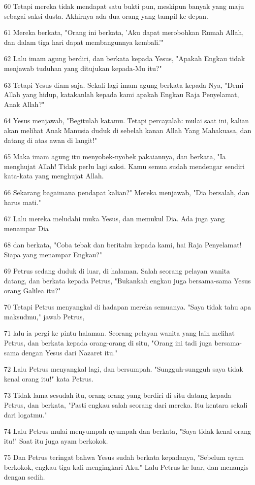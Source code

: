 \par 60 Tetapi mereka tidak mendapat satu bukti pun, meskipun banyak yang maju sebagai saksi dusta. Akhirnya ada dua orang yang tampil ke depan.
\par 61 Mereka berkata, "Orang ini berkata, 'Aku dapat merobohkan Rumah Allah, dan dalam tiga hari dapat membangunnya kembali.'"
\par 62 Lalu imam agung berdiri, dan berkata kepada Yesus, "Apakah Engkau tidak menjawab tuduhan yang ditujukan kepada-Mu itu?"
\par 63 Tetapi Yesus diam saja. Sekali lagi imam agung berkata kepada-Nya, "Demi Allah yang hidup, katakanlah kepada kami apakah Engkau Raja Penyelamat, Anak Allah?"
\par 64 Yesus menjawab, "Begitulah katamu. Tetapi percayalah: mulai saat ini, kalian akan melihat Anak Manusia duduk di sebelah kanan Allah Yang Mahakuasa, dan datang di atas awan di langit!"
\par 65 Maka imam agung itu menyobek-nyobek pakaiannya, dan berkata, "Ia menghujat Allah! Tidak perlu lagi saksi. Kamu semua sudah mendengar sendiri kata-kata yang menghujat Allah.
\par 66 Sekarang bagaimana pendapat kalian?" Mereka menjawab, "Dia bersalah, dan harus mati."
\par 67 Lalu mereka meludahi muka Yesus, dan memukul Dia. Ada juga yang menampar Dia
\par 68 dan berkata, "Coba tebak dan beritahu kepada kami, hai Raja Penyelamat! Siapa yang menampar Engkau?"
\par 69 Petrus sedang duduk di luar, di halaman. Salah seorang pelayan wanita datang, dan berkata kepada Petrus, "Bukankah engkau juga bersama-sama Yesus orang Galilea itu?"
\par 70 Tetapi Petrus menyangkal di hadapan mereka semuanya. "Saya tidak tahu apa maksudmu," jawab Petrus,
\par 71 lalu ia pergi ke pintu halaman. Seorang pelayan wanita yang lain melihat Petrus, dan berkata kepada orang-orang di situ, "Orang ini tadi juga bersama-sama dengan Yesus dari Nazaret itu."
\par 72 Lalu Petrus menyangkal lagi, dan bersumpah. "Sungguh-sungguh saya tidak kenal orang itu!" kata Petrus.
\par 73 Tidak lama sesudah itu, orang-orang yang berdiri di situ datang kepada Petrus, dan berkata, "Pasti engkau salah seorang dari mereka. Itu kentara sekali dari logatmu."
\par 74 Lalu Petrus mulai menyumpah-nyumpah dan berkata, "Saya tidak kenal orang itu!" Saat itu juga ayam berkokok.
\par 75 Dan Petrus teringat bahwa Yesus sudah berkata kepadanya, "Sebelum ayam berkokok, engkau tiga kali mengingkari Aku." Lalu Petrus ke luar, dan menangis dengan sedih.

